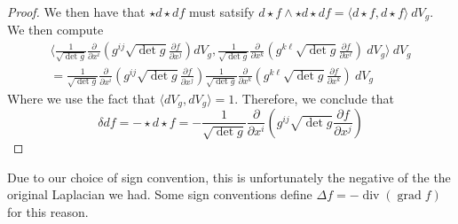\documentclass[psamsfonts]{amsart}
\theoremstyle{definition}
\theoremstyle{remark}
\DeclareMathOperator{\dv}{div}
\DeclareMathOperator{\grad}{grad}
\begin{document}
\begin{proof}
We then have that $\star d\star df$ must satsify $d\star f \wedge \star d\star df = \langle d\star f, d\star f \rangle~dV_g$. We then compute
\begin{align*}
\biggl\langle \frac{1}{\sqrt{\det g}} \frac{\partial}{\partial x^i}\left( g^{ij}\sqrt{\det g}\frac{\partial f}{\partial x^j} \right) dV_g, \frac{1}{\sqrt{\det g}} \frac{\partial}{\partial x^k}\left( g^{k\ell}\sqrt{\det g}\frac{\partial f}{\partial x^\ell} \right)~dV_g\biggr\rangle~dV_g  \\
= \frac{1}{\sqrt{\det g}} \frac{\partial}{\partial x^i}\left( g^{ij}\sqrt{\det g}\frac{\partial f}{\partial x^j} \right)    \frac{1}{\sqrt{\det g}} \frac{\partial}{\partial x^k}\left( g^{k\ell}\sqrt{\det g}\frac{\partial f}{\partial x^k} \right) ~dV_g
\end{align*}
Where we use the fact that $\langle dV_g, dV_g \rangle = 1$. Therefore, we conclude that 
$$\delta df = -\star d\star f = -\frac{1}{\sqrt{\det g}} \frac{\partial}{\partial x^i}\left( g^{ij}\sqrt{\det g}\frac{\partial f}{\partial x^j} \right) $$
\end{proof}
Due to our choice of sign convention, this is unfortunately the negative of the the original Laplacian we had. Some sign conventions define $\Delta f = -\dv(\grad f)$ for this reason.\\
\end{document}
